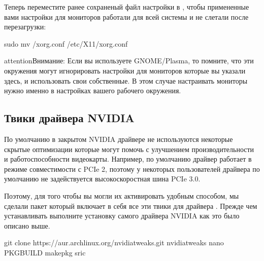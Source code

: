 \documentclass[letterpaper,10pt,russian,openany]{sphinxmanual}
\begin{document}
\noindent{}

\sphinxAtStartPar
Теперь переместите ранее сохраненый файл настройки в , чтобы примененные вами настройки для мониторов
работали для всей системы и не слетали после перезагрузки:

\begin{sphinxVerbatim}[commandchars=\\\{\}]
sudo mv \PYGZti{}/xorg.conf /etc/X11/xorg.conf
\end{sphinxVerbatim}

\begin{sphinxadmonition}{attention}{Внимание:}
\sphinxAtStartPar
Если вы используете GNOME/Plasma, то помните, что эти окружения могут игнорировать настройки для мониторов которые вы указали здесь,
и использовать свои собственные. В этом случае настраивать мониторы нужно именно в настройках вашего рабочего окружения.
\end{sphinxadmonition}

\ignorespaces 

\subsection{Твики драйвера NVIDIA}
\label{\detokenize{source/first-steps:nvidia-tweaking}}\label{\detokenize{source/first-steps:index-9}}\label{\detokenize{source/first-steps:id9}}
\sphinxAtStartPar
По умолчанию в закрытом NVIDIA драйвере не используются некоторые скрытые оптимизации которые могут помочь с улучшением производительности и работоспособности видеокарты.
Например, по умолчанию драйвер работает в режиме совместимости с PCIe 2, поэтому у некоторых пользователей драйвера по умолчанию не задействуется высокоскоростная шина PCIe 3.0.

\sphinxAtStartPar
Поэтому, для того чтобы вы могли их активировать удобным способом, мы сделали пакет который включает в себя все эти твики для драйвера
\sphinxhyphen{} . Прежде чем устанавливать выполните установку самого драйвера NVIDIA как это было описано выше.

\sphinxAtStartPar
{}

\begin{sphinxVerbatim}[commandchars=\\\{\}]
git clone https://aur.archlinux.org/nvidia\PYGZhy{}tweaks.git
 nvidia\PYGZhy{}tweaks
nano PKGBUILD 
makepkg \PYGZhy{}sric
\end{sphinxVerbatim}
\end{document}
